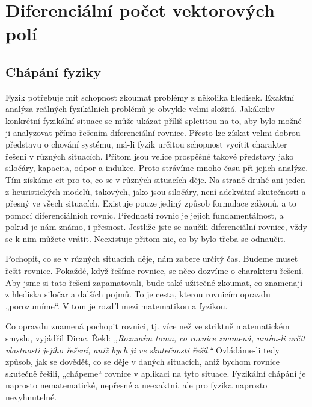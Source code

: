 \graphicspath{{../src/FYZ/img/}}
\setchaptertoc
\chapter{Diferenciální počet vektorových polí}\label{fyz:IIchapII}
  \section{Chápání fyziky}\label{fyz:IIchapIIsecI}
    Fyzik potřebuje mít schopnost zkoumat problémy z několika hledisek. Exaktní analýza reálných
    fyzikálních problémů je obvykle velmi složitá. Jakákoliv konkrétní fyzikální situace se může
    ukázat příliš spletitou na to, aby bylo možné ji analyzovat přímo řešením diferenciální rovnice.
    Přesto lze získat velmi dobrou představu o chování systému, má-li fyzik určitou schopnost
    vycítit charakter řešení v různých situacích. Přitom jsou velice prospěšné takové představy jako
    siločáry, kapacita, odpor a indukce. Proto strávíme mnoho času při jejich analýze. Tím získáme
    cit pro to, co se v různých situacích děje. Na straně druhé ani jeden z heuristických modelů,
    takových, jako jsou siločáry, není adekvátní skutečnosti a přesný ve všech situacích. Existuje
    pouze jediný způsob formulace zákonů, a to pomocí diferenciálních rovnic. Předností rovnic je
    jejich fundamentálnost, a pokud je nám známo, i přesnost. Jestliže jste se naučili diferenciální
    rovnice, vždy se k nim můžete vrátit. Neexistuje přitom nic, co by bylo třeba se odnaučit.
    
    Pochopit, co se v různých situacích děje, nám zabere určitý čas. Budeme muset řešit rovnice. 
    Pokaždé, když řešíme rovnice, se něco dozvíme o charakteru řešení. Aby jsme si tato řešení 
    zapamatovali, bude také užitečné zkoumat, co znamenají z hlediska siločar a dalších pojmů. To 
    je cesta, kterou rovnicím opravdu „porozumíme“. V tom je rozdíl mezi matematikou a fyzikou. 
    
    Co opravdu znamená pochopit rovnici, tj. více než ve stri\-ktně matematickém smyslu, vyjádřil 
    Dirac. Řekl: \emph{„Rozumím tomu, co rovnice znamená, umím-li určit vlastnosti jejího řešení, 
    aniž bych ji ve skutečnosti řešil.“} Ovládáme-li tedy způsob, jak se dovědět, co se děje v 
    daných  situacích, aniž bychom rovnice skutečně řešili, „chápeme“ rovnice v aplikaci na tyto 
    situace. Fyzikální chápání je naprosto nematematické, nepřesné a neexaktní, ale pro fyzika 
    naprosto nevyhnutelné.
    
